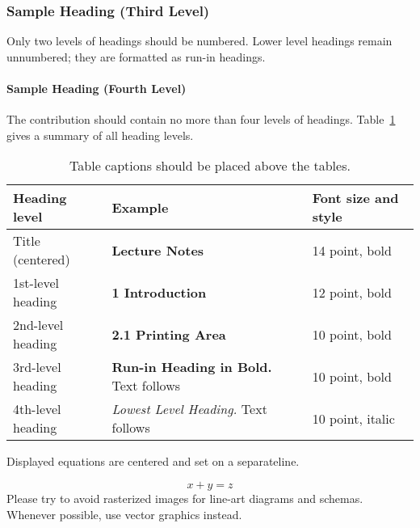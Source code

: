 \documentclass[runningheads]{llncs}
\begin{document}
\subsubsection{Sample Heading (Third Level)}
Only two levels of headings should be numbered. Lower level headings remain unnumbered; they are 
formatted as run-in headings.

\paragraph{Sample Heading (Fourth Level)}
The contribution should contain no more than four levels of headings. Table~\ref{tab1} gives a 
summary of all heading levels.

\begin{table}
    \caption{Table captions should be placed above the tables.}
    \label{tab1}
    \begin{tabular}{|l|l|l|}
        \hline
        Heading level     & Example                                          & Font size and style \\
        \hline
        Title (centered)  & {\Large\bfseries Lecture Notes}                  & 14 point, bold      \\
        1st-level heading & {\large\bfseries 1 Introduction}                 & 12 point, bold      \\
        2nd-level heading & {\bfseries 2.1 Printing Area}                    & 10 point, bold      \\
        3rd-level heading & {\bfseries Run-in Heading in Bold.} Text follows & 10 point, bold      \\
        4th-level heading & {\itshape Lowest Level Heading.} Text follows    & 10 point, italic    \\
        \hline
    \end{tabular}
\end{table}


\noindent Displayed equations are centered and set on a separateline.

\begin{equation}
    x + y = z
\end{equation}
Please try to avoid rasterized images for line-art diagrams and schemas. Whenever possible, use 
vector graphics instead.

\end{document}
